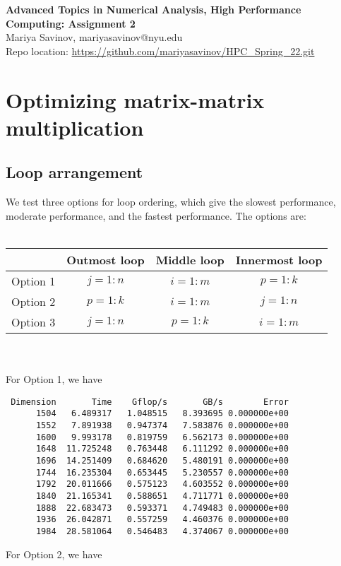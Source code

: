 \documentclass[10pt, letterpaper]{article}
\begin{document}
\begin{center}
{\bf
Advanced Topics in Numerical Analysis, High Performance Computing: \textbf{Assignment 2} \\
}
Mariya Savinov, mariyasavinov@nyu.edu\\
Repo location: \url{https://github.com/mariyasavinov/HPC_Spring_22.git}
\end{center}

\section{Optimizing matrix-matrix multiplication}
\subsection{Loop arrangement}
We test three options for loop ordering, which give the slowest performance, moderate performance, and the fastest performance. The options are:\\\\
\begin{tabular}{|c|c|c|c|}
  \hline
   & Outmost loop & Middle loop & Innermost loop \\ \hline \hline
  Option 1 & $j=1:n$ & $i=1:m$ & $p=1:k$  \\ \hline
  Option 2 & $p=1:k$ & $i=1:m$ & $j=1:n$  \\ \hline
  Option 3 & $j=1:n$ & $p=1:k$ & $i=1:m$ \\ \hline
  \hline
\end{tabular}\\\\
For Option 1, we have
\begin{verbatim}
 Dimension       Time    Gflop/s       GB/s        Error
      1504   6.489317   1.048515   8.393695 0.000000e+00
      1552   7.891938   0.947374   7.583876 0.000000e+00
      1600   9.993178   0.819759   6.562173 0.000000e+00
      1648  11.725248   0.763448   6.111292 0.000000e+00
      1696  14.251409   0.684620   5.480191 0.000000e+00
      1744  16.235304   0.653445   5.230557 0.000000e+00
      1792  20.011666   0.575123   4.603552 0.000000e+00
      1840  21.165341   0.588651   4.711771 0.000000e+00
      1888  22.683473   0.593371   4.749483 0.000000e+00
      1936  26.042871   0.557259   4.460376 0.000000e+00
      1984  28.581064   0.546483   4.374067 0.000000e+00
\end{verbatim}
For Option 2, we have
\end{document}
